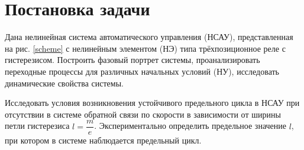 


	
	
	\setcounter{page}{2}
	\tableofcontents
	\newpage
	
	\section{Постановка задачи}
	
	Дана нелинейная система автоматического управления (НСАУ), представленная на рис. \ref{scheme} с  нелинейным элементом (НЭ) типа трёхпозиционное реле с гистерезисом. Построить фазовый портрет системы, проанализировать переходные процессы для различных начальных условий (НУ), исследовать динамические свойства системы.
	
	Исследовать условия возникновения устойчивого предельного цикла в НСАУ при отсутствии в системе обратной связи по скорости в зависимости от ширины петли гистерезиса $l = \dfrac{m}{e}$. Экспериментально определить предельное значение $l$, при котором в системе наблюдается предельный цикл.
	



